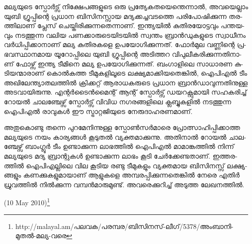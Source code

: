 
­മ­ല്യ­യു­ടെ സ്പോര്‍­ട്സ് നി­ക്ഷേ­പ­ങ്ങ­ളു­ടെ ഒരു പ്ര­ത്യേ­ക­ത­യെ­ന്തെ­ന്നാല്‍, അവ­യെ­ല്ലാം യു­ബി ഗ്രൂ­പ്പി­ന്റെ പ്ര­ധാന ബി­സി­ന­സ്സായ 
മദ്യ­ക്ക­ച്ച­വ­ട­ത്തെ പരി­പോ­ഷി­ക്കു­ന്ന തര­ത്തി­ലാ­ണ് പ്ലേ­സ് ചെ­യ്തി­രി­ക്കു­ന്ന­തെ­ന്നാ­ണ്. ഇന്ത്യ­യില്‍ കു­തി­ര­യോ­ട്ട­വും പന്ത­യ­വും 
നട­ത്തു­ന്ന വലിയ പണ­ക്കാ­രു­ടെ­യി­ട­യില്‍ സ്വ­ന്തം ബ്രാന്‍­ഡു­ക­ളു­ടെ സ്വാ­ധീ­നം വര്‍­ധി­പ്പി­ക്കാ­നാ­ണ് മല്യ കു­തി­ര­ക­ളെ 
ഉപ­യോ­ഗി­ക്കു­ന്ന­ത്. ഫോര്‍­മുല വണ്ണി­ന്റെ പ്ര­ഭ­വ­സ്ഥാ­ന­മായ യൂ­റോ­പ്പി­ലെ യു­ബി ഗ്രൂ­പ്പി­ന്റെ അടി­ത്തറ വി­പു­ലീ­ക­രി­ക്കു­ന്ന­തി­നാ­ണ് 
ഫോ­ഴ്സ് ഇന്ത്യ ടീ­മി­നെ മല്യ ഉപ­യോ­ഗി­ക്കു­ന്ന­ത്. ബം­ഗാ­ളി­ലെ സാ­ധാ­രണ കു­ടി­യ­ന്മാ­രാ­ണ് കൊല്‍­ക­ത്ത ടീ­മു­ക­ളി­ലൂ­ടെ 
ലക്ഷ്യ­മാ­ക്കി­യ­തെ­ങ്കില്‍, ഐപി­എല്‍ ടീം അഖി­ലേ­ന്ത്യാ­ത­ല­ത്തില്‍ ക്രി­ക്ക­റ്റ് ആരാ­ധ­ക­രു­ടെ പ്ര­ധാന ബ്രാന്‍­ഡാ­വു­ന്ന­തി­നു­ള്ള 
അട­വാ­യി­രു­ന്നു. എന്റര്‍­ടൈന്‍­മൈ­ന്റ് ആന്റ് സ്പോര്‍­ട്സ് ഡയ­റ­ക്റ്റു­മാ­യി സഹ­ക­രി­ച്ച് റോ­യല്‍ ചാ­ല­ഞ്ചേ­ഴ്സ് സ്പോര്‍­ട്സ് 
വി­വിധ നഗ­ര­ങ്ങ­ളി­ലെ ക്ല­ബ്ബു­ക­ളില്‍ നട­ത്തു­ന്ന ഐപി­എല്‍ രാ­വു­കള്‍ ഈ സ്ട്രാ­റ്റ­ജി­യു­ടെ നേ­രു­ദാ­ഹ­ര­ണ­മാ­ണ്.

അ­തു­കൊ­ണ്ടു തന്നെ പു­റ­മേ­നി­ന്നു­ള്ള സ്പോണ്‍­സര്‍­മാ­രെ പ്രോ­ത്സാ­ഹി­പ്പി­ക്കാ­ത്ത മല്യ­യു­ടെ നയം കാ­ര്യ­ങ്ങള്‍ കൂ­ടു­തല്‍ 
വ്യ­ക്ത­മാ­ക്കു­ന്നു. അതി­നാല്‍ റോ­യല്‍ ചാ­ല­ഞ്ചേ­ഴ്സ് ബാം­ഗ്ലൂര്‍ ടീം ഉണ്ടാ­ക്കു­ന്ന ലാ­ഭ­ത്തില്‍ ഐപി­എല്‍ മാ­മാ­ങ്ക­ത്തില്‍ 
നി­ന്ന് മല്യ­യു­ടെ മദ്യ ബ്രാ­ന്റു­കള്‍ ഉണ്ടാ­ക്കു­ന്ന ലാ­ഭം കൂ­ടി ചേര്‍­ക്കേ­ണ്ട­താ­ണ്. ഇത്ത­ര­ത്തില്‍ ഐപി­എ­ല്ലി­ലെ വില കൂ­ടിയ 
രണ്ടു ടീ­മു­ക­ളും വ്യ­ക്ത­മായ ബി­സി­ന­സ്സ് ലക്ഷ്യ­ങ്ങ­ളും കണ­ക്കു­ക­ളു­മാ­യാ­ണ് ആളു­ക­ളെ അമ്പ­ര­പ്പി­ക്കു­ന്ന­തെ­ങ്കില്‍ നേ­രെ 
എതിര്‍ ധ്രു­വ­ത്തില്‍ നില്‍­ക്കു­ന്ന വമ്പന്‍­മാ­രു­മു­ണ്ട്. അവ­രെ­ക്കു­റി­ച്ച് അടുത്ത ലേ­ഖ­ന­ത്തില്‍.

(10 May 2010)\footnote{http://malayal.am/പലവക/പരമ്പര/ബിസിനസ്-ലീഗ്/5378/അംബാനി-മുതല്‍-മല്യ-വരെ}

\newpage
